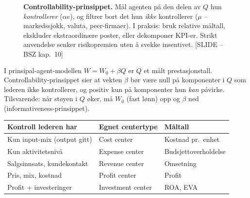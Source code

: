 \begin{figure}[H]
\centering
{}
\caption{\textbf{Controllability-prinsippet.} Mål agenten på den delen av $Q$ hun \emph{kontrollerer} ($\alpha e$), og filtrer bort det hun \emph{ikke} kontrollerer ($\mu$ -- markedssjokk, valuta, peer-firmaer). I praksis: bruk relative måltall, ekskluder ekstraordinære poster, eller dekomponer KPI-er. Strikt anvendelse senker risikopremien uten å svekke insentivet. [SLIDE -- BSZ kap.\ 10]}
\end{figure}

I prinsipal-agent-modellen $W = W_0 + \beta Q$ er $Q$ et målt prestasjonstall. Controllability-prinsippet sier at vekten $\beta$ bør være null på komponenter i $Q$ som lederen ikke kontrollerer, og positiv kun på komponenter hun \emph{kan} påvirke. Tilsvarende: når støyen i $Q$ øker, må $W_0$ (fast lønn) opp og $\beta$ ned (informativeness-prinsippet).

\begin{center}
\begin{tabular}{@{}lll@{}}
\toprule
\textbf{Kontroll lederen har} & \textbf{Egnet centertype} & \textbf{Måltall} \\
\midrule
Kun input-mix (output gitt) & Cost center & Kostnad pr.\ enhet \\
Kun aktivitetsnivå & Expense center & Budsjettoverholdelse \\
Salgsinnsats, kundekontakt & Revenue center & Omsetning \\
Pris, mix, kostnad & Profit center & Profit \\
Profit + investeringer & Investment center & ROA, EVA \\
\bottomrule
\end{tabular}
\end{center}

